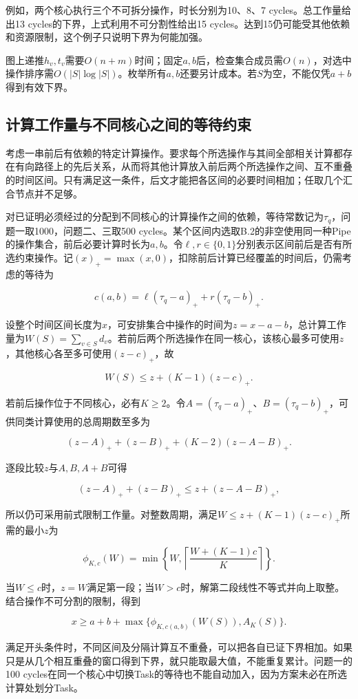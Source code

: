 \documentclass[anonymous,notoc]{gmcm2026}
\begin{document}
例如，两个核心执行三个不可拆分操作，时长分别为10、8、7 cycles。总工作量给出13 cycles的下界，上式利用不可分割性给出15 cycles。达到15仍可能受其他依赖和资源限制，这个例子只说明下界为何能加强。

图上递推\(h_v,t_v\)需要\(O(n+m)\)时间；固定\(a,b\)后，检查集合成员需\(O(n)\)，对选中操作排序需\(O(|S|\log|S|)\)。枚举所有\(a,b\)还要另计成本。若\(S\)为空，不能仅凭\(a+b\)得到有效下界。

\subsection{计算工作量与不同核心之间的等待约束}

考虑一串前后有依赖的特定计算操作。要求每个所选操作与其间全部相关计算都存在有向路径上的先后关系，从而将其他计算放入前后两个所选操作之间、互不重叠的时间区间。只有满足这一条件，后文才能把各区间的必要时间相加；任取几个汇合节点并不足够。

对已证明必须经过的分配到不同核心的计算操作之间的依赖，等待常数记为\(\tau_q\)，问题一取1000，问题二、三取500 cycles。某个区间内选取B.2的非空使用同一种Pipe的操作集合，前后必要计算时长为\(a,b\)。令\(\ell,r\in\{0,1\}\)分别表示区间前后是否有所选约束操作。记\((x)_+=\max(x,0)\)，扣除前后计算已经覆盖的时间后，仍需考虑的等待为

\[c(a,b)=\ell(\tau_q-a)_++r(\tau_q-b)_+.\]

设整个时间区间长度为\(x\)，可安排集合中操作的时间为\(z=x-a-b\)，总计算工作量为\(W(S)=\sum_{v\in S}d_v\)。若前后两个所选操作在同一核心，该核心最多可使用\(z\)，其他核心各至多可使用\((z-c)_+\)，故

\[W(S)\le z+(K-1)(z-c)_+.\]

若前后操作位于不同核心，必有\(K\ge2\)。令\(A=(\tau_q-a)_+\)、\(B=(\tau_q-b)_+\)，可供同类计算使用的总周期数至多为

\[(z-A)_++(z-B)_++(K-2)(z-A-B)_+.\]

逐段比较\(z\)与\(A,B,A+B\)可得

\[(z-A)_++(z-B)_+\le z+(z-A-B)_+,\]

所以仍可采用前式限制工作量。对整数周期，满足\(W\le z+(K-1)(z-c)_+\)所需的最小\(z\)为

\[\phi_{K,c}(W)=\min\left\{W,\left\lceil\frac{W+(K-1)c}{K}\right\rceil\right\}.\]

当\(W\le c\)时，\(z=W\)满足第一段；当\(W>c\)时，解第二段线性不等式并向上取整。结合操作不可分割的限制，得到

\[x\ge a+b+\max\{\phi_{K,c(a,b)}(W(S)),A_K(S)\}.\]

满足开头条件时，不同区间及分隔计算互不重叠，可以把各自已证下界相加。如果只是从几个相互重叠的窗口得到下界，就只能取最大值，不能重复累计。问题一的100 cycles在同一个核心中切换Task的等待也不能自动加入，因为方案未必在所选计算处划分Task。
\end{document}
